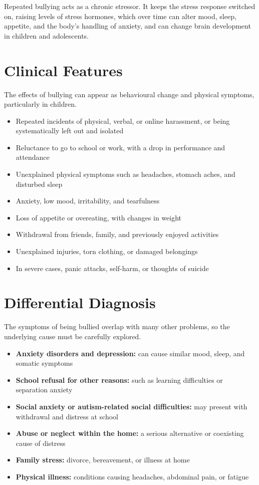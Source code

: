 Repeated bullying acts as a chronic stressor. It keeps the stress response switched on, raising levels of stress hormones, which over time can alter mood, sleep, appetite, and the body's handling of anxiety, and can change brain development in children and adolescents.

\section*{Clinical Features}
The effects of bullying can appear as behavioural change and physical symptoms, particularly in children.

\begin{itemize}
    \item Repeated incidents of physical, verbal, or online harassment, or being systematically left out and isolated
    \item Reluctance to go to school or work, with a drop in performance and attendance
    \item Unexplained physical symptoms such as headaches, stomach aches, and disturbed sleep
    \item Anxiety, low mood, irritability, and tearfulness
    \item Loss of appetite or overeating, with changes in weight
    \item Withdrawal from friends, family, and previously enjoyed activities
    \item Unexplained injuries, torn clothing, or damaged belongings
    \item In severe cases, panic attacks, self-harm, or thoughts of suicide
\end{itemize}

\section*{Differential Diagnosis}
The symptoms of being bullied overlap with many other problems, so the underlying cause must be carefully explored.

\begin{itemize}
    \item \textbf{Anxiety disorders and depression:} can cause similar mood, sleep, and somatic symptoms
    \item \textbf{School refusal for other reasons:} such as learning difficulties or separation anxiety
    \item \textbf{Social anxiety or autism-related social difficulties:} may present with withdrawal and distress at school
    \item \textbf{Abuse or neglect within the home:} a serious alternative or coexisting cause of distress
    \item \textbf{Family stress:} divorce, bereavement, or illness at home
    \item \textbf{Physical illness:} conditions causing headaches, abdominal pain, or fatigue
\end{itemize}

